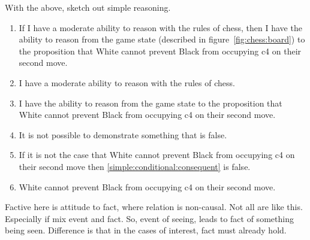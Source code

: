 \documentclass[10pt]{article}
\begin{document}
\begin{note}
  With the above, sketch out simple reasoning.
 {
   \color{red}
   \begin{enumerate}
   \item\label{simple:conditional:claim} If I have a moderate ability to reason with the rules of chess, then I have the ability to reason from the game state (described in figure~\ref{fig:chess:board}) to the proposition that White cannot prevent Black from occupying c4 on their second move.
   \item\label{simple:conditional:antecedent} I have a moderate ability to reason with the rules of chess.
   \item\label{simple:conditional:consequent} I have the ability to reason from the game state to the proposition that White cannot prevent Black from occupying c4 on their second move.
   \item\label{simple:conditional:factive-demonstration} It is not possible to demonstrate something that is false.
   \item\label{simple:conditional:necessity} If it is not the case that White cannot prevent Black from occupying c4 on their second move then \ref{simple:conditional:consequent} is false.
   \item\label{simple:conditional:focus} White cannot prevent Black from occupying c4 on their second move.
   \end{enumerate}
 }
\end{note}

\begin{note}
  Factive here is attitude to fact, where relation is non-causal.
  Not all are like this.
  Especially if mix event and fact.
  So, event of seeing, leads to fact of something being seen.
  Difference is that in the cases of interest, fact must already hold.
\end{note}
\end{document}
